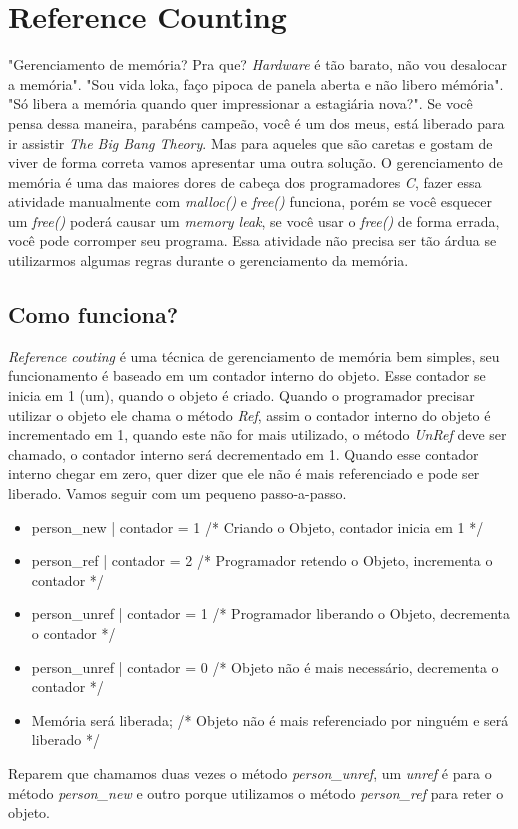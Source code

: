 

\chapter{Reference Counting}

"Gerenciamento de memória? Pra que? \textit{Hardware} é tão barato, não vou desalocar a memória". "Sou vida loka, faço pipoca de panela aberta e não libero mémória".
"Só libera a memória quando quer impressionar a estagiária nova?". Se você pensa dessa maneira, parabéns campeão, você é um dos meus, 
está liberado para ir assistir \textit{The Big Bang Theory}. Mas para aqueles que são caretas e gostam de viver de forma correta vamos apresentar uma outra solução.
O gerenciamento de memória é uma das maiores dores de cabeça dos programadores \textit{C}, fazer essa atividade manualmente com 
\textit{malloc()} e \textit{free()} funciona, porém se você esquecer um \textit{free()} poderá causar um \textit{memory leak}, se você usar o \textit{free()} de 
forma errada, você pode corromper seu programa. Essa atividade não precisa ser tão árdua se utilizarmos algumas regras durante o gerenciamento da memória.


\section{Como funciona?}
\textit{Reference couting} é uma técnica de gerenciamento de memória bem simples, seu funcionamento é baseado em um contador interno 
do objeto. Esse contador se inicia em 1 (um), quando o objeto é criado. Quando o programador precisar utilizar o objeto ele chama o método
\textit{Ref}, assim o contador interno do objeto é incrementado em 1, quando este não for mais utilizado, o método \textit{UnRef}
deve ser chamado, o contador interno será decrementado em 1. Quando esse contador interno chegar em zero, quer dizer que ele não 
é mais referenciado e pode ser liberado. Vamos seguir com um pequeno passo-a-passo.

\vspace{5 mm}

\begin{itemize}
  \item person\_new   | contador = 1  /* Criando o Objeto, contador inicia em 1 */
  \item person\_ref   | contador = 2  /* Programador retendo o Objeto, incrementa o contador */
  \item person\_unref | contador = 1  /* Programador liberando o Objeto, decrementa o contador */
  \item person\_unref | contador = 0  /* Objeto não é mais necessário, decrementa o contador */
  \item Memória será liberada;        /* Objeto não é mais referenciado por ninguém e será liberado */
\end{itemize}
\vspace{5 mm}
Reparem que chamamos duas vezes o método \textit{person\_unref}, um \textit{unref} é para o método \textit{person\_new} e outro porque utilizamos o método \textit{person\_ref} para reter
o objeto.

